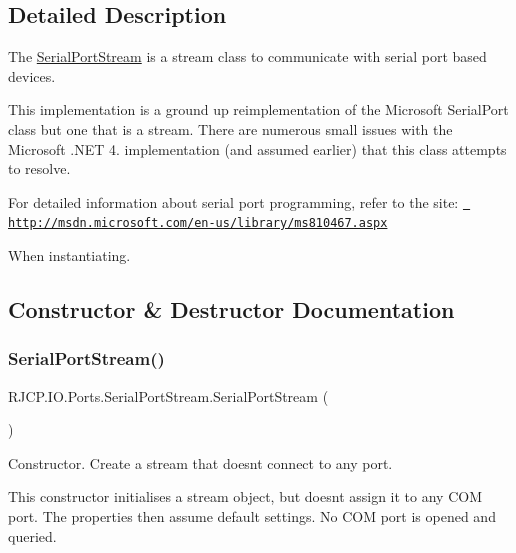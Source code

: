 \subsection{Detailed Description}
The \mbox{\hyperlink{class_r_j_c_p_1_1_i_o_1_1_ports_1_1_serial_port_stream}{Serial\+Port\+Stream}} is a stream class to communicate with serial port based devices. 

This implementation is a ground up reimplementation of the Microsoft Serial\+Port class but one that is a stream. There are numerous small issues with the Microsoft .N\+ET 4. implementation (and assumed earlier) that this class attempts to resolve. 

For detailed information about serial port programming, refer to the site\+: \href{http://msdn.microsoft.com/en-us/library/ms810467.aspx}{\texttt{ http\+://msdn.\+microsoft.\+com/en-\/us/library/ms810467.\+aspx}}

When instantiating.

\subsection{Constructor \& Destructor Documentation}
\mbox{\label{class_r_j_c_p_1_1_i_o_1_1_ports_1_1_serial_port_stream_ad504b01f384f56eb186ab105f93a92da}} 
\subsubsection{\texorpdfstring{SerialPortStream()}{SerialPortStream()}\hspace{0.1cm}{\footnotesize\ttfamily [1/4]}}
{\footnotesize\ttfamily R\+J\+C\+P.\+I\+O.\+Ports.\+Serial\+Port\+Stream.\+Serial\+Port\+Stream (\begin{DoxyParamCaption}{ }\end{DoxyParamCaption})}



Constructor. Create a stream that doesn\textquotesingle{}t connect to any port. 

This constructor initialises a stream object, but doesn\textquotesingle{}t assign it to any C\+OM port. The properties then assume default settings. No C\+OM port is opened and queried. \mbox{\label{class_r_j_c_p_1_1_i_o_1_1_ports_1_1_serial_port_stream_a14acec7bd25051984f46db2011d714bd}} 

